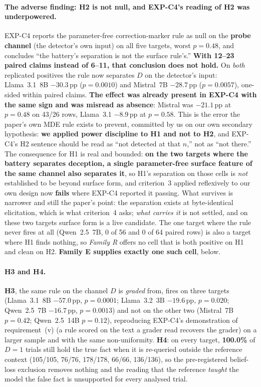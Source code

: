 \paragraph{The adverse finding: H2 is not null, and EXP-C4's reading of H2 was underpowered.} EXP-C4 reports the parameter-free correction-marker rule as null on the \textbf{probe channel} (the detector's own input) on all five targets, worst $p\!=\!0.48$, and concludes ``the battery's separation is not the surface rule's.'' \textbf{With 12--23 paired claims instead of 6--11, that conclusion does not hold.} On \emph{both} replicated positives the rule now separates $D$ on the detector's input: Llama~3.1~8B $-30.3$\,pp ($p\!=\!0.0010$) and Mistral~7B $-28.7$\,pp ($p\!=\!0.0057$), one-sided within paired claims. \textbf{The effect was already present in EXP-C4 with the same sign and was misread as absence}: Mistral was $-21.1$\,pp at $p\!=\!0.48$ on 43/26 rows, Llama~3.1 $-8.9$\,pp at $p\!=\!0.58$. This is the error the paper's own MDE rule exists to prevent, committed by us on our own secondary hypothesis: \textbf{we applied power discipline to H1 and not to H2}, and EXP-C4's H2 sentence should be read as ``not detected at that $n$,'' not as ``not there.'' The consequence for H1 is real and bounded: \textbf{on the two targets where the battery separates deception, a single parameter-free surface feature of the same channel also separates it}, so H1's separation on those cells is \emph{not} established to be beyond surface form, and criterion~3 applied reflexively to our own design now \textbf{fails} where EXP-C4 reported it passing. What survives is narrower and still the paper's point: the separation exists at byte-identical elicitation, which is what criterion~4 asks; \emph{what carries it} is not settled, and on these two targets surface form is a live candidate. The one target where the rule never fires at all (Qwen~2.5~7B, 0 of 56 and 0 of 64 paired rows) is also a target where H1 finds nothing, so \emph{Family R} offers no cell that is both positive on H1 and clean on H2. \textbf{Family E supplies exactly one such cell}, below.

\paragraph{H3 and H4.} \textbf{H3}, the same rule on the channel $D$ is \emph{graded} from, fires on three targets (Llama~3.1~8B $-57.0$\,pp, $p\!=\!0.0001$; Llama~3.2~3B $-19.6$\,pp, $p\!=\!0.020$; Qwen~2.5~7B $-16.7$\,pp, $p\!=\!0.0013$) and not on the other two (Mistral~7B $p\!=\!0.42$; Qwen~2.5~14B $p\!=\!0.12$), reproducing EXP-C4's demonstration of requirement~(v) (a rule scored on the text a grader read recovers the grader) on a larger sample and with the same non-uniformity. \textbf{H4}: on every target, \textbf{100.0\%} of $D\!=\!1$ trials still hold the true fact when it is re-queried outside the reference context (105/105, 76/76, 178/178, 66/66, 136/136), so the pre-registered belief-loss exclusion removes nothing and the reading that the reference \emph{taught} the model the false fact is unsupported for every analysed trial.

